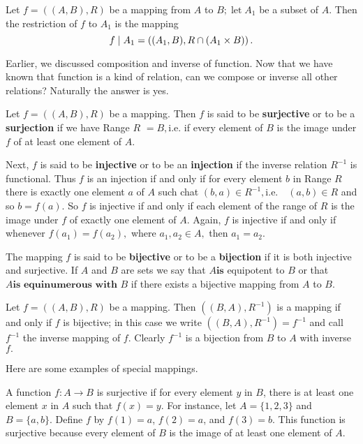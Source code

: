     Let $ f=((A,B),R)$ be a mapping from $A$ to $B;\operatorname*{let}A_1$ be a subset of $A.$ Then the restriction of $f$ to $A_1$ is the mapping
    $$
    f\mid A_1= \left((A_1,B\\),R\cap(A_1\times B)\right).
    $$

    Earlier, we discussed composition and inverse of function. Now that we have known that function is a kind of 
    relation, can we compose or inverse all other relations? Naturally the answer is yes.
	
	\begin{definition}
		Let $f= ( ( A, B) , R) $ be a mapping. Then $f$ is said to be \textbf{surjective} or to be a \textbf{surjection} if we have
		Range $R$ $= B, $i.e. if every element of $B$ is the image under $f$ of at least one element of $A.$
		
		Next, $f$ is said to be \textbf{injective} or to be an \textbf{injection} if the inverse relation $R^{-1}$ is functional. Thus $f$ is an injection if and only if for every element $b$ in Range $R$ there is exactly one element $a$ of $A$ such chat $( b, a) \in R^{- 1}, $i.e.$\quad ( a, b) \in R$ and so $b=f(a).$ So $f$ is injective if and only if each element of the range of $R$ is the image under $f$ of exactly one element of $A.$ Again, $f$ is injective if and only if whenever $f( a_{1}) = f( a_{2}) , $ where $a_{1}, a_{2}\in A, $ then $a_{1}= a_{2}.$
		
		The mapping $f$ is said to be \textbf{bijective} or to be a \textbf{bijection} if it is both injective and surjective. If $A$ and $B$ are sets we say that $A\textbf{is}$ equipotent to $B$ or that $A\textbf{is equinumerous with }B$ if there exists a bijective mapping from $A$ to $B.$
		
		Let $f=((A,B),R)$ be a mapping. Then $((B,A),R^{-1})$ is a mapping if and only if $f$ is bijective; in this case we write $((B,A),R^{-1})=f^{-1}$ and call $f^{-1}$ the inverse mapping of $f.$ Clearly $f^{-1}$ is a bijection from $B$ to $A$ with inverse $f.$
		\end{definition}
		Here are some examples of special mappings.
		\begin{example}
			A function \( f: A \to B \) is surjective if for every element \( y \) in \( B \), there is at least one element \( x \) in \( A \) such that \( f(x) = y \). For instance, let \( A = \{1, 2, 3\} \) and \( B = \{a, b\} \). Define \( f \) by \( f(1) = a \), \( f(2) = a \), and \( f(3) = b \). This function is surjective because every element of \( B \) is the image of at least one element of \( A \).
		\end{example}
		
